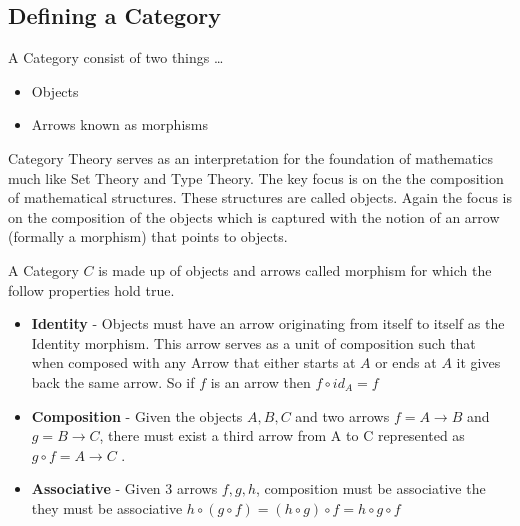 \subsection{Defining a Category}

A Category consist of two things \ldots

\begin{itemize}
  \item Objects
  \item Arrows known as morphisms
\end{itemize}

Category Theory serves as an interpretation for the foundation of mathematics much like Set Theory and Type Theory. The key focus is on the the composition of mathematical structures. These structures are called objects. Again the focus is on the composition of the objects which is captured with the notion of an arrow (formally a morphism) that points to objects.

A Category $C$ is made up of objects and arrows called morphism for which the follow properties hold true.

\begin{itemize}
  \item \textbf{Identity} - Objects must have an arrow originating from itself to itself as the Identity morphism. This arrow serves as a unit of composition such that when composed with any Arrow that either starts at $A$ or ends at $A$ it gives back the same arrow. So if $f$ is an arrow then $f \circ id_A = f$
  \item \textbf{Composition} - Given the objects $A, B, C$ and two arrows $f = A \rightarrow B$ and $g = B \rightarrow C$, there must exist a third arrow from A to C represented as $g \circ f = A \rightarrow C$ .
  \item \textbf{Associative} - Given 3 arrows $f, g, h$, composition must be associative the they must be associative $h \circ (g \circ f) = (h \circ g) \circ f = h \circ g \circ f$
\end{itemize}